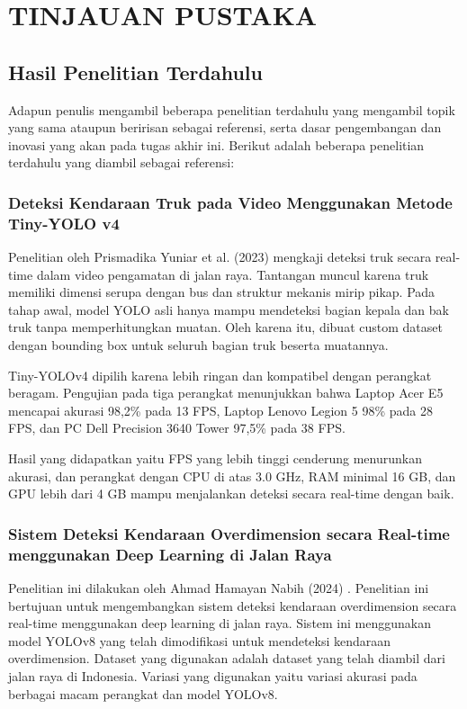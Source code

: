 \chapter{TINJAUAN PUSTAKA}
\label{chap:tinjauanpustaka}



\section{Hasil Penelitian Terdahulu}
\label{sec:hasilpenelitianterdahulu}
Adapun penulis mengambil beberapa penelitian terdahulu yang mengambil topik yang sama ataupun beririsan sebagai referensi, serta dasar pengembangan dan inovasi yang akan pada tugas akhir ini. Berikut adalah beberapa penelitian terdahulu yang diambil sebagai referensi:

\subsection{Deteksi Kendaraan Truk pada Video Menggunakan Metode Tiny-YOLO v4}
\label{subsec:deteksikendaraantrukprismadika}
Penelitian oleh Prismadika Yuniar et al. (2023) \parencite*{prismadika2023} mengkaji deteksi truk secara real-time dalam video pengamatan di jalan raya. Tantangan muncul karena truk memiliki dimensi serupa dengan bus dan struktur mekanis mirip pikap. Pada tahap awal, model YOLO asli hanya mampu mendeteksi bagian kepala dan bak truk tanpa memperhitungkan muatan. Oleh karena itu, dibuat custom dataset dengan bounding box untuk seluruh bagian truk beserta muatannya.

Tiny-YOLOv4 dipilih karena lebih ringan dan kompatibel dengan perangkat beragam. Pengujian pada tiga perangkat menunjukkan bahwa Laptop Acer E5 mencapai akurasi 98,2\% pada 13 FPS, Laptop Lenovo Legion 5 98\% pada 28 FPS, dan PC Dell Precision 3640 Tower 97,5\% pada 38 FPS. 

Hasil yang didapatkan yaitu FPS yang lebih tinggi cenderung menurunkan akurasi, dan perangkat dengan CPU di atas 3.0 GHz, RAM minimal 16 GB, dan GPU lebih dari 4 GB mampu menjalankan deteksi secara real-time dengan baik.

\subsection{Sistem Deteksi Kendaraan Overdimension secara Real-time menggunakan Deep Learning di Jalan Raya}
\label{subsec:deteksikendaraanoverdimensionhamayan}
Penelitian ini dilakukan oleh Ahmad Hamayan Nabih (2024) \parencite*{hamayan2024}. Penelitian ini bertujuan untuk mengembangkan sistem deteksi kendaraan overdimension secara real-time menggunakan deep learning di jalan raya. Sistem ini menggunakan model YOLOv8 yang telah dimodifikasi untuk mendeteksi kendaraan overdimension. Dataset yang digunakan adalah dataset yang telah diambil dari jalan raya di Indonesia. Variasi yang digunakan yaitu variasi akurasi pada berbagai macam perangkat dan model YOLOv8.

